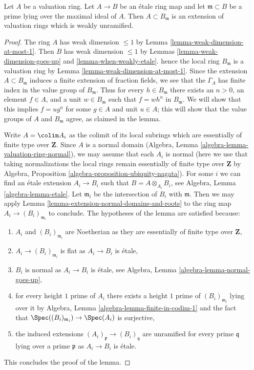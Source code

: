 \begin{lemma}
\label{lemma-etale-extension-valuation-ring}
Let $A$ be a valuation ring. Let $A \to B$ be an \'etale ring map
and let $\mathfrak m \subset B$ be a prime lying over the maximal
ideal of $A$. Then $A \subset B_\mathfrak m$ is an extension of
valuation rings which is weakly unramified.
\end{lemma}

\begin{proof}
The ring $A$ has weak dimension $\leq 1$ by
Lemma \ref{lemma-weak-dimension-at-most-1}. Then $B$ has weak dimension
$\leq 1$ by Lemmas \ref{lemma-weak-dimension-goes-up} and
\ref{lemma-when-weakly-etale}. hence the local ring $B_\mathfrak m$
is a valuation ring by Lemma \ref{lemma-weak-dimension-at-most-1}.
Since the extension $A \subset B_\mathfrak m$ induces a finite
extension of fraction fields,
we see that the $\Gamma_A$ has finite index in the value group of
$B_{\mathfrak m}$. Thus for every $h \in B_\mathfrak m$ there exists
an $n > 0$, an element $f \in A$, and a unit $w \in B_\mathfrak m$
such that $f = w h^n$ in $B_\mathfrak m$. We will show that this implies
$f = ug^n$ for some $g \in A$ and unit $u \in A$; this will show that
the value groups of $A$ and $B_\mathfrak m$ agree, as claimed in the lemma.

\medskip\noindent
Write $A = \colim A_i$ as the colimit of its local subrings which
are essentially of finite type over $\mathbf{Z}$. Since $A$
is a normal domain (Algebra, Lemma \ref{algebra-lemma-valuation-ring-normal}),
we may assume that each $A_i$ is normal (here we use that taking
normalizations the local rings remain essentially of finite type
over $\mathbf{Z}$ by
Algebra, Proposition \ref{algebra-proposition-ubiquity-nagata}).
For some $i$ we can find an \'etale extension $A_i \to B_i$
such that $B = A \otimes_{A_i} B_i$, see
Algebra, Lemma \ref{algebra-lemma-etale}.
Let $\mathfrak m_i$ be the intersection of $B_i$ with $\mathfrak m$.
Then we may apply Lemma \ref{lemma-extension-normal-domains-and-roots}
to the ring map $A_i \to (B_i)_{\mathfrak m_i}$ to conclude.
The hypotheses of the lemma are satisfied because:
\begin{enumerate}
\item $A_i$ and $(B_i)_{\mathfrak m_i}$ are Noetherian as they are
essentially of finite type over $\mathbf{Z}$,
\item $A_i \to (B_i)_{\mathfrak m_i}$ is flat as $A_i \to B_i$ is \'etale,
\item $B_i$ is normal as $A_i \to B_i$ is \'etale, see
Algebra, Lemma \ref{algebra-lemma-normal-goes-up},
\item for every height $1$ prime of $A_i$ there exists a height $1$
prime of $(B_i)_{\mathfrak m_i}$ lying over it by
Algebra, Lemma \ref{algebra-lemma-finite-in-codim-1} and the fact that
$\Spec((B_i)_{\mathfrak m_i}) \to \Spec(A_i)$ is surjective,
\item the induced extensions $(A_i)_\mathfrak p \to (B_i)_\mathfrak q$
are unramified for every prime $\mathfrak q$ lying over a prime
$\mathfrak p$ as $A_i \to B_i$ is \'etale.
\end{enumerate}
This concludes the proof of the lemma.
\end{proof}